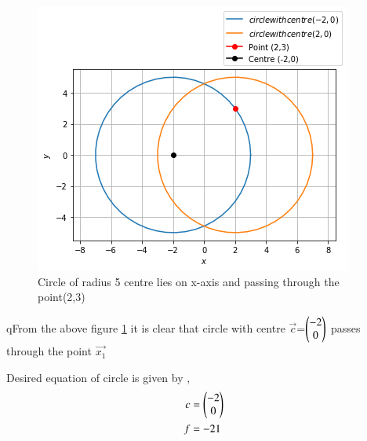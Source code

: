 \begin{figure}[h]
    \centering
    \includegraphics[width=\columnwidth]{./solutions/1/2/assignment5.png}
    \caption{Circle of radius 5 centre lies on x-axis and passing through the point(2,3)}
    \label{Fig :1solutions/2/}
\end{figure}

qFrom the above figure \ref{Fig :1solutions/2/} it is clear that circle with centre $\vec{c}$=$\begin{pmatrix}-2\\0\end{pmatrix}$ passes through the point $\vec{x_1}$

Desired equation of circle is given by  ,
\begin{align}
        c&=\begin{pmatrix}-2 \\ 0\end{pmatrix}\\
        f&=-21
\end{align}

